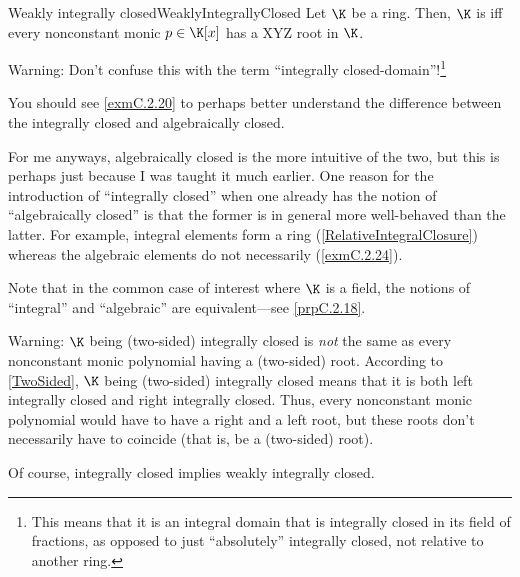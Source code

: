 \begin{mdf}{Weakly integrally closed}{WeaklyIntegrallyClosed}
	Let $\K$ be a ring.  Then, $\K$ is  iff every nonconstant monic $p\in \K [x]$ has a XYZ root in $\K$.
	\begin{rmk}
		Warning:  Don't confuse this with the term ``integrally closed-domain''!\footnote{This means that it is an integral domain that is integrally closed in its field of fractions, as opposed to just ``absolutely'' integrally closed, not relative to another ring.}
	\end{rmk}
	\begin{rmk}
		You should see \cref{exmC.2.20} to perhaps better understand the difference between the integrally closed and algebraically closed.
		
		For me anyways, algebraically closed is the more intuitive of the two, but this is perhaps just because I was taught it much earlier.  One reason for the introduction of ``integrally closed'' when one already has the notion of ``algebraically closed'' is that the former is in general more well-behaved than the latter.  For example, integral elements form a ring (\cref{RelativeIntegralClosure}) whereas the algebraic elements do not necessarily (\cref{exmC.2.24}).
	\end{rmk}
	\begin{rmk}
		Note that in the common case of interest where $\K$ is a field, the notions of ``integral'' and ``algebraic'' are equivalent---see \cref{prpC.2.18}.
	\end{rmk}
	\begin{rmk}
		Warning:  $\K$ being (two-sided) integrally closed is \emph{not} the same as every nonconstant monic polynomial having a (two-sided) root.  According to \cref{TwoSided}, $\K$ being (two-sided) integrally closed means that it is both left integrally closed and right integrally closed.  Thus, every nonconstant monic polynomial would have to have a right and a left root, but these roots don't necessarily have to coincide (that is, be a (two-sided) root).
	\end{rmk}
	\begin{rmk}
		Of course, integrally closed implies weakly integrally closed.
	\end{rmk}
\end{mdf}
